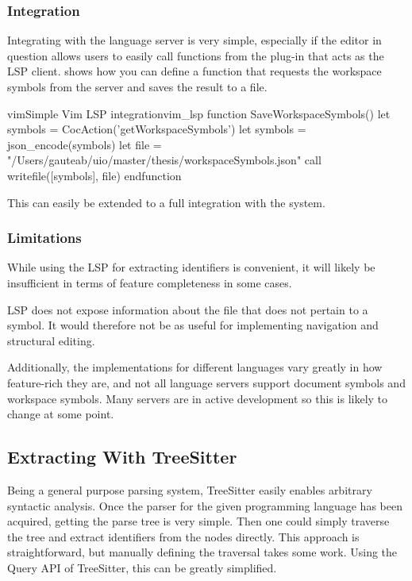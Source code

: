 \documentclass[../thesis.tex]{subfiles}
\begin{document}
\subsubsection{Integration}%
Integrating with the language server is very simple, especially if the editor in question allows users to easily
call functions from the plug-in that acts as the LSP client.
 shows how you can define a function that requests the workspace symbols from the server and saves the result
to a file.
\begin{code}{vim}{Simple Vim LSP integration}{vim_lsp}
function SaveWorkspaceSymbols()
    let symbols = CocAction('getWorkspaceSymbols')
    let symbols = json_encode(symbols)
    let file = "/Users/gauteab/uio/master/thesis/workspaceSymbols.json"
    call writefile([symbols], file)
endfunction
\end{code}
This can easily be extended to a full integration with the system.

\subsubsection{Limitations}
While using the LSP for extracting identifiers is convenient, it will likely be insufficient in terms of feature completeness in some cases.

LSP does not expose information about the file that does not pertain to a symbol.
It would therefore not be as useful for implementing navigation and structural editing.

Additionally, the implementations for different languages vary greatly in how feature-rich they are, and not all language servers support document symbols and workspace symbols.
Many servers are in active development so this is likely to change at some point.



\subsection{Extracting With TreeSitter}
Being a general purpose parsing system, TreeSitter easily enables arbitrary syntactic analysis.
Once the parser for the given programming language has been acquired, getting the parse tree
is very simple.
Then one could simply traverse the tree and extract identifiers from the nodes directly.
This approach is straightforward, but manually defining the traversal takes some work.
Using the Query API of TreeSitter, this can be greatly simplified.
\end{document}
